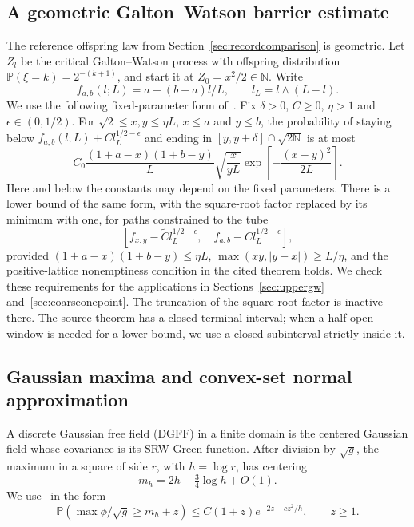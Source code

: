 \documentclass[11pt,a4paper]{article}
\numberwithin{equation}{section}
\theoremstyle{remark}
\begin{document}
\subsection{A geometric Galton--Watson barrier estimate}\label{sec:gw}
The reference offspring law from Section~\ref{sec:recordcomparison} is geometric. Let $Z_l$ be the critical Galton--Watson process with offspring distribution $\mathbb P(\xi=k)=2^{-(k+1)}$, and start it at $Z_0=x^2/2\in\mathbb N$. Write
\[
f_{a,b}(l;L)=a+(b-a)l/L,\qquad l_L=l\wedge(L-l).
\]
We use the following fixed-parameter form of~\cite[Theorem 9.1]{GW}. Fix $\delta>0$, $C\ge0$, $\eta>1$ and $\epsilon\in(0,1/2)$. For $\sqrt2\le x,y\le\eta L$, $x\le a$ and $y\le b$, the probability of staying below $f_{a,b}(l;L)+Cl_L^{1/2-\epsilon}$ and ending in $[y,y+\delta]\cap\sqrt{2\mathbb N}$ is at most
\begin{equation}\label{eq:3.1}
C_0\frac{(1+a-x)(1+b-y)}L
\sqrt{\frac{x}{yL}}\exp\left[-\frac{(x-y)^2}{2L}\right].
\end{equation}
Here and below the constants may depend on the fixed parameters. There is a lower bound of the same form, with the square-root factor replaced by its minimum with one, for paths constrained to the tube
\begin{equation}\label{eq:3.2}
[f_{x,y}-\widetilde C l_L^{1/2+\epsilon},\quad
 f_{a,b}-Cl_L^{1/2-\epsilon}],
\end{equation}
provided $(1+a-x)(1+b-y)\le\eta L$, $\max(xy,|y-x|)\ge L/\eta$, and the positive-lattice nonemptiness condition in the cited theorem holds. We check these requirements for the applications in Sections~\ref{sec:uppergw} and~\ref{sec:coarseonepoint}. The truncation of the square-root factor is inactive there. The source theorem has a closed terminal interval; when a half-open window is needed for a lower bound, we use a closed subinterval strictly inside it.

\subsection{Gaussian maxima and convex-set normal approximation}\label{sec:gaussianinputs}
A discrete Gaussian free field (DGFF) in a finite domain is the centered Gaussian field whose covariance is its SRW Green function. After division by $\sqrt g$, the maximum in a square of side $r$, with $h=\log r$, has centering
\[
m_h=2h-\tfrac34\log h+O(1).
\]
We use~\cite[Lemma 3.8, equation (39)]{BDZ} in the form
\begin{equation}\label{eq:3.3}
\mathbb P(\max\phi/\sqrt g\ge m_h+z)
\le C(1+z)e^{-2z-cz^2/h},\qquad z\ge1.
\end{equation}
\end{document}
